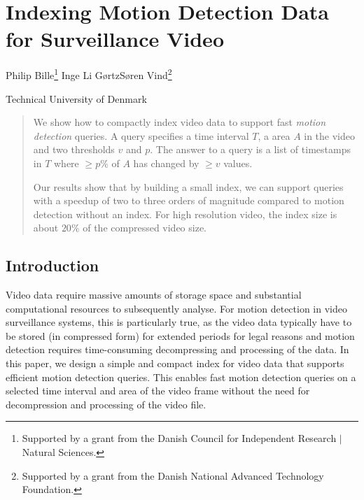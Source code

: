 \chapter{Indexing Motion Detection Data for Surveillance Video}
\begin{infosection}
    \begin{authors}
        Philip Bille\footnote{Supported by a grant from the Danish Council for Independent Research $\vert$ Natural Sciences.} \qquad Inge Li G{\o}rtz\samethanks \qquad S{\o}ren Vind\footnote{Supported by a grant from the Danish National Advanced Technology Foundation.}
    \end{authors}

    \begin{uninames}
        Technical University of Denmark
    \end{uninames}


    \begin{abstract}
        We show how to compactly index video data to support fast \emph{motion detection} queries. 
        A query specifies a time interval $T$, a area $A$ in the video and two thresholds $v$ and $p$. The answer to a query is a list of timestamps in $T$ where $\geq p\%$ of $A$ has changed by $\geq v$ values.
    
        Our results show that by building a small index, we can support queries with a speedup of two to three orders of magnitude compared to motion detection without an index. For high resolution video, the index size is about $20\%$ of the compressed video size.
    \end{abstract}
\end{infosection}


\section{Introduction}
Video data require massive amounts of storage space and substantial computational resources to subsequently analyse. For motion detection in video surveillance systems, this is particularly true, as the video data typically have to be stored (in compressed form) for extended periods for legal reasons and motion detection requires time-consuming decompressing and processing of the data. In this paper, we design a simple and compact index for video data that supports efficient motion detection queries. This enables fast motion detection queries on a selected time interval and area of the video frame without the need for decompression and processing of the video file. 

